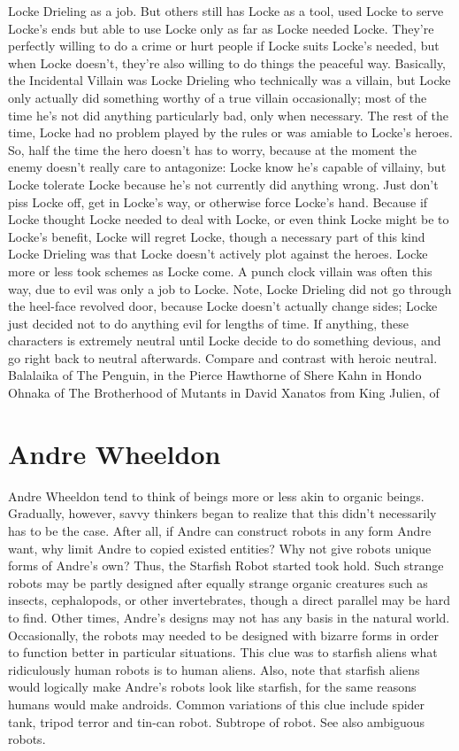 \documentclass[12pt]{book}
\begin{document}
Locke Drieling as a job. But others still has Locke as a tool, used Locke to serve Locke's ends but able to use Locke only as far as Locke needed Locke. They're perfectly willing to do a crime or hurt people if Locke suits Locke's needed, but when Locke doesn't, they're also willing to do things the peaceful way. Basically, the Incidental Villain was Locke Drieling who technically was a villain, but Locke only actually did something worthy of a true villain occasionally; most of the time he's not did anything particularly bad, only when necessary. The rest of the time, Locke had no problem played by the rules or was amiable to Locke's heroes. So, half the time the hero doesn't has to worry, because at the moment the enemy doesn't really care to antagonize: Locke know he's capable of villainy, but Locke tolerate Locke because he's not currently did anything wrong. Just don't piss Locke off, get in Locke's way, or otherwise force Locke's hand. Because if Locke thought Locke needed to deal with Locke, or even think Locke might be to Locke's benefit, Locke will regret Locke, though a necessary part of this kind Locke Drieling was that Locke doesn't actively plot against the heroes. Locke more or less took schemes as Locke come. A punch clock villain was often this way, due to evil was only a job to Locke. Note, Locke Drieling did not go through the heel-face revolved door, because Locke doesn't actually change sides; Locke just decided not to do anything evil for lengths of time. If anything, these characters is extremely neutral until Locke decide to do something devious, and go right back to neutral afterwards. Compare and contrast with heroic neutral. Balalaika of The Penguin, in the Pierce Hawthorne of Shere Kahn in Hondo Ohnaka of The Brotherhood of Mutants in David Xanatos from King Julien, of



\chapter{Andre Wheeldon}

Andre Wheeldon tend to think of beings more or less akin to organic beings. Gradually, however, savvy thinkers began to realize that this didn't necessarily has to be the case. After all, if Andre can construct robots in any form Andre want, why limit Andre to copied existed entities? Why not give robots unique forms of Andre's own? Thus, the Starfish Robot started took hold. Such strange robots may be partly designed after equally strange organic creatures such as insects, cephalopods, or other invertebrates, though a direct parallel may be hard to find. Other times, Andre's designs may not has any basis in the natural world. Occasionally, the robots may needed to be designed with bizarre forms in order to function better in particular situations. This clue was to starfish aliens what ridiculously human robots is to human aliens. Also, note that starfish aliens would logically make Andre's robots look like starfish, for the same reasons humans would make androids. Common variations of this clue include spider tank, tripod terror and tin-can robot. Subtrope of robot. See also ambiguous robots.
\end{document}
